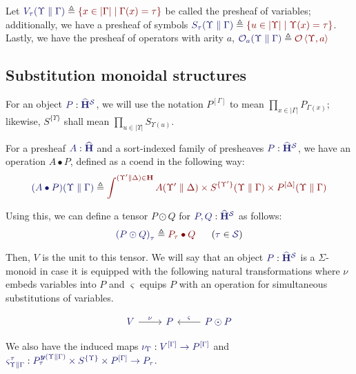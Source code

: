 \documentclass[11pt]{article}
\theoremstyle{definition}
\theoremstyle{remark}
\numberwithin{equation}{section}
\def\IModeColorName{MidnightBlue}
\def\OModeColorName{Maroon}
\newcommand\IMode[1]{{\color{\IModeColorName}{#1}}}
\newcommand\OMode[1]{{\color{\OModeColorName}{#1}}}
\newcommand\HypJ[2]{#1\ \ (#2)}
\newcommand\MkSet[1]{\left\{#1\right\}}
\newcommand\Member[2]{\IMode{#1}\in\IMode{#2}}
\newcommand\Of[2]{\IMode{#1}: \IMode{#2}}
\newcommand\Sorts{\mathcal{S}}
\newcommand\Operators{\mathcal{O}}
\newcommand\HypCat{\mathbf{H}}
\newcommand\Pair[2]{\left\langle#1, #2 \right\rangle}
\newcommand\Dom[1]{\left\vert#1\right\vert}
\newcommand\Define[2]{\IMode{#1}\triangleq\OMode{#2}}
\newcommand\Yoneda[1]{\boldsymbol{y} (#1)}
\begin{document}
Let $\Define{V_\tau(\Upsilon\parallel\Gamma)}{\MkSet{x\in\Dom\Gamma\mid
\Gamma(x)=\tau}}$ be called the presheaf of variables; additionally, we have a
presheaf of symbols
$\Define{S_\tau(\Upsilon\parallel\Gamma)}{\MkSet{u\in\Dom\Upsilon\mid
\Upsilon(x)=\tau}}$. Lastly, we have the presheaf of operators with arity $a$,
$\Define{\Operators_a(\Upsilon\parallel\Gamma)}{\Operators\Pair{\Upsilon}{a}}$

\subsection{Substitution monoidal structures}

For an object $\Of{P}{\widehat{\HypCat}^\Sorts}$, we will use the notation
$P^{[\Gamma]}$ to mean $\prod_{x\in\Dom\Gamma}P_{\Gamma(x)}$; likewise,
$S^{\{\Upsilon\}}$ shall mean $\prod_{u\in\Dom\Upsilon}S_{\Upsilon(u)}$.

For a presheaf $\Of{A}{\widehat{\HypCat}}$ and a sort-indexed family of
presheaves $\Of{P}{\widehat{\HypCat}^\Sorts}$, we have an operation $A\bullet
P$, defined as a coend in the following way:
\[
  \Define{(A\bullet P)(\Upsilon\parallel\Gamma)}{
    \int^{(\Upsilon'\parallel\Delta)\in\HypCat}
      A(\Upsilon'\parallel\Delta)
      \times S^{\{\Upsilon'\}}(\Upsilon\parallel\Gamma)
      \times P^{[\Delta]}(\Upsilon\parallel\Gamma)
  }
\]

Using this, we can define a tensor $P\odot Q$ for
$\Of{P,Q}{\widehat{\HypCat}^\Sorts}$ as follows:
\[
  \HypJ{
    \Define{{(P\odot Q)}_{\tau}}{
      P_\tau\bullet Q
    }
    \quad
  }{
    \Member{\tau}{\Sorts}
  }
\]

Then, $V$ is the unit to this tensor. We will say that an object
$\Of{P}{\widehat{\HypCat}^\Sorts}$ is a $\Sigma$-monoid in case it is equipped
with the following natural transformations where $\nu$ embeds variables into
$P$ and $\varsigma$ equips $P$ with an operation for simultaneous substitutions
of variables.

\[
  \begin{tikzcd}[ampersand replacement = \&]
    {\IMode{V}} \arrow[r, "\IMode\nu"]
    \& {\IMode{P}}
    \& {\IMode{P\odot P}}
    \arrow[l, "\IMode\varsigma", swap]
  \end{tikzcd}
\]

We also have the induced maps $\Of{\nu_\Gamma}{V^{[\Gamma]}\to P^{[\Gamma]}}$
and
$\Of{\varsigma^\tau_{\Upsilon\parallel\Gamma}}{P_\tau^{\Yoneda{\Upsilon\parallel\Gamma}}
\times S^{\{\Upsilon\}}\times P^{[\Gamma]}\to P_\tau}$.
\end{document}
